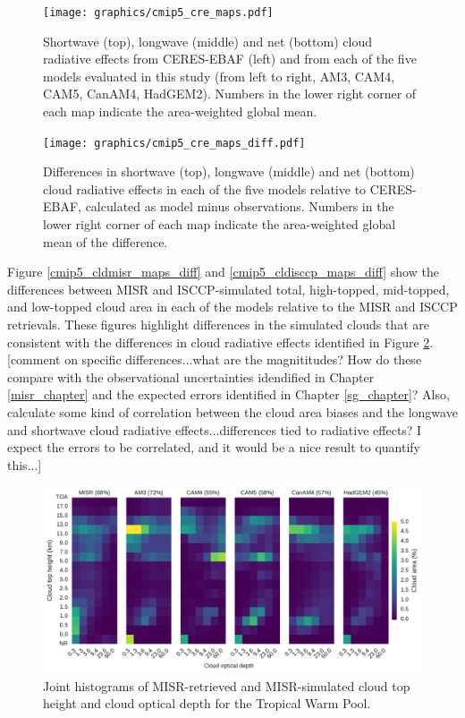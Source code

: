\begin{figure}
\centering
\texttt{[image: graphics/cmip5\_cre\_maps.pdf]}
\caption{Shortwave (top), longwave (middle) and net (bottom) cloud radiative effects from CERES-EBAF (left) and from each of the five models evaluated in this study (from left to right, AM3, CAM4, CAM5, CanAM4, HadGEM2). Numbers in the lower right corner of each map indicate the area-weighted global mean.}
\label{cmip5_cre_maps}
\end{figure}

\begin{figure}
\centering
\texttt{[image: graphics/cmip5\_cre\_maps\_diff.pdf]}
\caption{Differences in shortwave (top), longwave (middle) and net (bottom) cloud radiative effects in each of the five models relative to CERES-EBAF, calculated as model minus observations. Numbers in the lower right corner of each map indicate the area-weighted global mean of the difference.}
\label{cmip5_cre_maps_diff}
\end{figure}

Figure \ref{cmip5_cldmisr_maps_diff} and \ref{cmip5_cldisccp_maps_diff} show the differences between MISR and ISCCP-simulated total, high-topped, mid-topped, and low-topped cloud area in each of the models relative to the MISR and ISCCP retrievals. These figures highlight differences in the simulated clouds that are consistent with the differences in cloud radiative effects identified in Figure \ref{cmip5_cre_maps_diff}. [comment on specific differences...what are the magnititudes? How do these compare with the observational uncertainties idendified in Chapter \ref{misr_chapter} and the expected errors identified in Chapter \ref{sg_chapter}? Also, calculate some kind of correlation between the cloud area biases and the longwave and shortwave cloud radiative effects...differences tied to radiative effects? I expect the errors to be correlated, and it would be a nice result to quantify this...]

\begin{figure}
\centering
\includegraphics[width=\columnwidth]{graphics/cmip5_clMISR_TropicalWarmPool.pdf}
\caption{Joint histograms of MISR-retrieved and MISR-simulated cloud top height and cloud optical depth for the Tropical Warm Pool.}
\label{cmip5_clMISR_TropicalWarmPool}
\end{figure}


